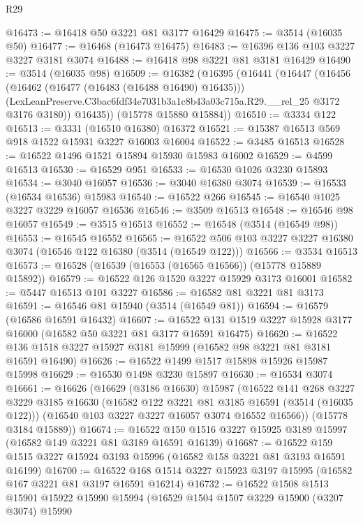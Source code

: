 \begin{lexlean}{R29}
\begin{coremodule}
@16473 := @16418 @50 @3221 @81 @3177 @16429
@16475 := @3514 (@16035 @50)
@16477 := @16468 (@16473 @16475)
@16483 := @16396 @136 @103 @3227 @3227 @3181 @3074
@16488 := @16418 @98 @3221 @81 @3181 @16429
@16490 := @3514 (@16035 @98)
@16509 := @16382
    (@16395
      (@16441
        (@16447
          (@16456
            (@16462 (@16477 (@16483 (@16488 @16490) @16435)))
            (LexLeanPreserve.C3bac6fdf34e7031b3a1c8b43a03c715a.R29.__rel_25 @3172 @3176 @3180))
          @16435))
      (@15778 @15880 @15884))
@16510 := @3334 @122
@16513 := @3331 (@16510 @16380) @16372
@16521 := @15387 @16513 @569 @918 @1522 @15931 @3227 @16003 @16004
@16522 := @3485 @16513
@16528 := @16522 @1496 @1521 @15894 @15930 @15983 @16002
@16529 := @4599 @16513
@16530 := @16529 @951
@16533 := @16530 @1026 @3230 @15893
@16534 := @3040 @16057
@16536 := @3040 @16380 @3074
@16539 := @16533 (@16534 @16536) @15983
@16540 := @16522 @266
@16545 := @16540 @1025 @3227 @3229 @16057 @16536
@16546 := @3509 @16513
@16548 := @16546 @98 @16057
@16549 := @3515 @16513
@16552 := @16548 (@3514 (@16549 @98))
@16553 := @16545 @16552
@16565 := @16522 @506 @103 @3227 @3227 @16380 @3074 (@16546 @122 @16380 (@3514 (@16549 @122)))
@16566 := @3534 @16513
@16573 := @16528 (@16539 (@16553 (@16565 @16566)) (@15778 @15889 @15892))
@16579 := @16522 @126 @1520 @3227 @15929 @3173 @16001
@16582 := @5447 @16513 @101 @3227
@16586 := @16582 @81 @3221 @81 @3173
@16591 := @16546 @81 @15940 (@3514 (@16549 @81))
@16594 := @16579 (@16586 @16591 @16432)
@16607 := @16522 @131 @1519 @3227 @15928 @3177 @16000 (@16582 @50 @3221 @81 @3177 @16591 @16475)
@16620 := @16522 @136 @1518 @3227 @15927 @3181 @15999 (@16582 @98 @3221 @81 @3181 @16591 @16490)
@16626 := @16522 @1499 @1517 @15898 @15926 @15987 @15998
@16629 := @16530 @1498 @3230 @15897
@16630 := @16534 @3074
@16661 := @16626
    (@16629
      (@3186 @16630)
      @15987
      (@16522
        @141
        @268
        @3227
        @3229
        @3185
        @16630
        (@16582 @122 @3221 @81 @3185 @16591 (@3514 (@16035 @122)))
        (@16540 @103 @3227 @3227 @16057 @3074 @16552 @16566))
      (@15778 @3184 @15889))
@16674 := @16522 @150 @1516 @3227 @15925 @3189 @15997 (@16582 @149 @3221 @81 @3189 @16591 @16139)
@16687 := @16522 @159 @1515 @3227 @15924 @3193 @15996 (@16582 @158 @3221 @81 @3193 @16591 @16199)
@16700 := @16522 @168 @1514 @3227 @15923 @3197 @15995 (@16582 @167 @3221 @81 @3197 @16591 @16214)
@16732 := @16522
    @1508
    @1513
    @15901
    @15922
    @15990
    @15994
    (@16529
      @1504
      @1507
      @3229
      @15900
      (@3207 @3074)
      @15990

\end{coremodule}
\end{lexlean}
